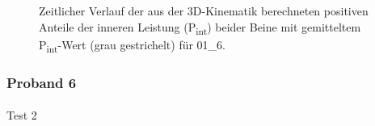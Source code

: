 \documentclass[
  letterpaper,
  DIV=11]{scrartcl}
\makeatletter
\let\oldparagraph\paragraph
\renewcommand{\paragraph}{
    \@ifstar
      \xxxParagraphStar
      \xxxParagraphNoStar
  }
\newcommand{\xxxParagraphStar}[1]{\oldparagraph*{#1}\mbox{}}
\newcommand{\xxxParagraphNoStar}[1]{\oldparagraph{#1}\mbox{}}
\makeatother
\begin{document}
\begin{figure}


\caption{\label{fig-PInt_Kinematik_01_6}Zeitlicher Verlauf der aus der
3D-Kinematik berechneten positiven Anteile der inneren Leistung
(P\textsubscript{int}) beider Beine mit gemitteltem
P\textsubscript{int}-Wert (grau gestrichelt) für 01\_6.}

\end{figure}%

\subsubsection{Proband 6}

\paragraph{Test 2}
\end{document}
